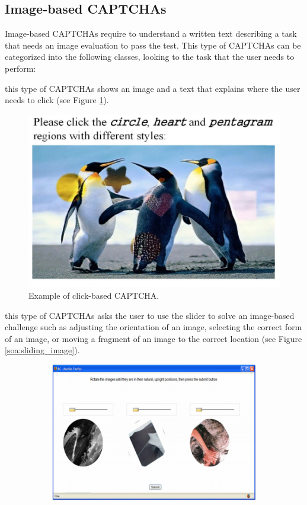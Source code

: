 \subsection{Image-based CAPTCHAs}
Image-based CAPTCHAs require to understand a written text describing a task that needs an image evaluation to pass the test. This type of CAPTCHAs can be categorized into the following classes, looking to the task that the user needs to perform:
\begin{itemize}
{this type of CAPTCHAs shows an image and a text that explains where the user needs to click (see Figure \ref{soa:click_CAPTCHA}).
\begin{figure}[h]
     \centering
     \includegraphics[width=.45\linewidth]{Images/StateOfArt/click_CAPTCHA}
     \caption{\footnotesize{Example of click-based CAPTCHA.}}\label{soa:click_CAPTCHA}
\end{figure}
}
{this type of CAPTCHAs asks the user to use the slider to solve an image-based challenge such as adjusting the orientation of an image, selecting the correct form of an image, or moving a fragment of an image to the correct location (see Figure \ref{soa:sliding_image}).
\begin{figure}[h]
     \centering
     \begin{subfigure}[b]{0.48\textwidth}
         \centering
         \includegraphics[width=.9\linewidth]{Images/StateOfArt/sliding_image_CAPTCHA}

\end{subfigure}
\end{figure}}
\end{itemize}
